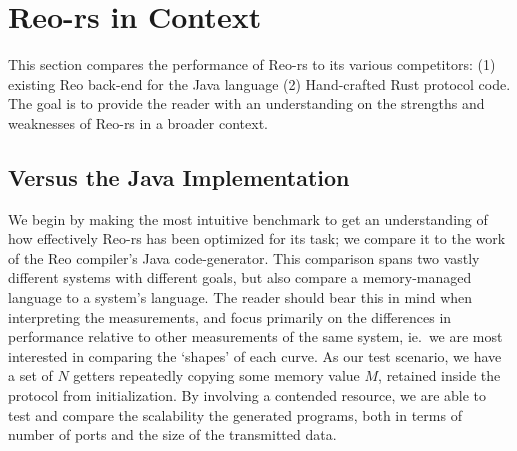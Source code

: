 \section{Reo-rs in Context}
\label{sec:in_context}
This section compares the performance of Reo-rs to its various competitors: (1) existing Reo back-end for the Java language (2) Hand-crafted Rust protocol code. The goal is to provide the reader with an understanding on the strengths and weaknesses of Reo-rs in a broader context.

\subsection{Versus the Java Implementation}
We begin by making the most intuitive benchmark to get an understanding of how effectively Reo-rs has been optimized for its task; we compare it to the work of the Reo compiler's Java code-generator. This comparison spans two vastly different systems with different goals, but also compare a memory-managed language to a system's language. The reader should bear this in mind when interpreting the measurements, and focus primarily on the differences in performance relative to other measurements of the same system, ie.\ we are most interested in comparing the `shapes' of each curve. As our test scenario, we have a set of $N$ getters repeatedly copying some memory value $M$, retained inside the protocol from initialization. By involving a contended resource, we are able to test and compare the scalability the generated programs, both in terms of number of ports and the size of the transmitted data.

